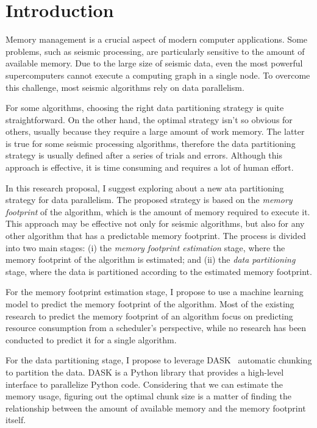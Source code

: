 \section{Introduction}
\label{sec:introduction}

Memory management is a crucial aspect of modern computer applications.
Some problems, such as seismic processing, are particularly sensitive to the amount of available memory.
Due to the large size of seismic data, even the most powerful supercomputers cannot execute a computing graph in a single node.
To overcome this challenge, most seismic algorithms rely on data parallelism.

For some algorithms, choosing the right data partitioning strategy is quite straightforward.
On the other hand, the optimal strategy isn't so obvious for others, usually because they require a large amount of work memory.
The latter is true for some seismic processing algorithms, therefore the data partitioning strategy is usually defined after a series of trials and errors.
Although this approach is effective, it is time consuming and requires a lot of human effort.

In this research proposal, I suggest exploring about a new ata partitioning strategy for data parallelism.
The proposed strategy is based on the \emph{memory footprint} of the algorithm, which is the amount of memory required to execute it.
This approach may be effective not only for seismic algorithms, but also for any other algorithm that has a predictable memory footprint.
The process is divided into two main stages:
(i) the \emph{memory footprint estimation} stage, where the memory footprint of the algorithm is estimated; and
(ii) the \emph{data partitioning} stage, where the data is partitioned according to the estimated memory footprint.

For the memory footprint estimation stage, I propose to use a machine learning model to predict the memory footprint of the algorithm.
Most of the existing research to predict the memory footprint of an algorithm focus on predicting resource consumption from a scheduler's perspective, while no research has been conducted to predict it for a single algorithm.

For the data partitioning stage, I propose to leverage DASK~\cite{dask} automatic chunking to partition the data.
DASK is a Python library that provides a high-level interface to parallelize Python code.
Considering that we can estimate the memory usage, figuring out the optimal chunk size is a matter of finding the relationship between the amount of available memory and the memory footprint itself.

